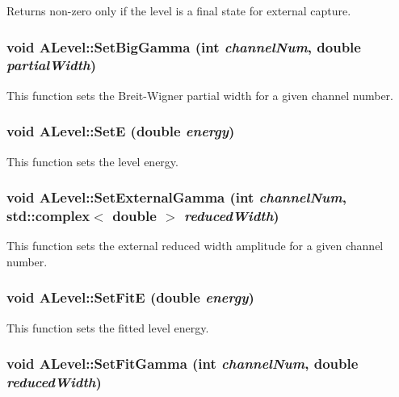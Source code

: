 Returns non-zero only if the level is a final state for external capture. 
\subsubsection{\setlength{\rightskip}{0pt plus 5cm}void ALevel::Set\-Big\-Gamma (int {\em channel\-Num}, double {\em partial\-Width})}\label{classALevel_c115f07710b71697e07f58c3b9cdb3e4}


This function sets the Breit-Wigner partial width for a given channel number. 
\subsubsection{\setlength{\rightskip}{0pt plus 5cm}void ALevel::Set\-E (double {\em energy})}\label{classALevel_c90b2f45ac13d664f64d9b4ad39f595b}


This function sets the level energy. 
\subsubsection{\setlength{\rightskip}{0pt plus 5cm}void ALevel::Set\-External\-Gamma (int {\em channel\-Num}, std::complex$<$ double $>$ {\em reduced\-Width})}\label{classALevel_bc6c899b8e3a7d2295fbd96c5ad0cb30}


This function sets the external reduced width amplitude for a given channel number. 
\subsubsection{\setlength{\rightskip}{0pt plus 5cm}void ALevel::Set\-Fit\-E (double {\em energy})}\label{classALevel_f8eb63fcaf925f7d038eb68f1ceed9f7}


This function sets the fitted level energy. 
\subsubsection{\setlength{\rightskip}{0pt plus 5cm}void ALevel::Set\-Fit\-Gamma (int {\em channel\-Num}, double {\em reduced\-Width})}\label{classALevel_7fd8095ecf5a30af03f778c56876539e}


